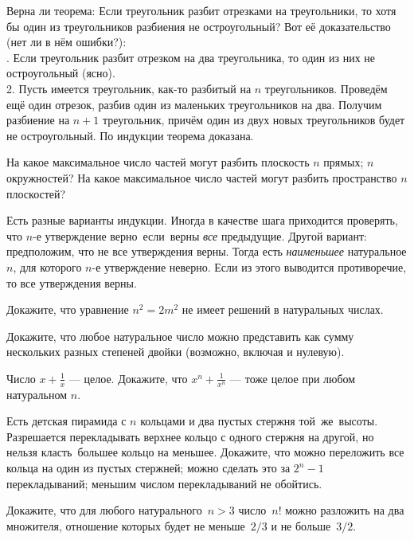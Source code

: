 \documentclass[a4paper,11pt]{article}
\begin{document}
 Верна ли теорема:  Если треугольник разбит отрезками
на треугольники, то хотя бы один из треугольников разбиения не
остроугольный?
Вот е\"е доказательство (нет ли в н\"ем ошибки?):\\
{. Если треугольник разбит отрезком на два треугольника,
то один из них не остроугольный (ясно).\\
2. Пусть имеется треугольник, как-то разбитый на $n$ треугольников.
Провед\"ем ещ\"е один отрезок, разбив один из маленьких треугольников
на два. Получим разбиение на $n+1$ треугольник, прич\"ем один из
двух новых треугольников будет не остроугольный.
По индукции теорема доказана.}

На какое максимальное число частей могут разбить плоскость
 $n$ прямых;  $n$ окружностей?
%
 На какое максимальное число частей могут разбить пространство
$n$ плоскостей?

\smallskip

{\footnotesize
\noindent
Есть разные варианты индукции. Иногда в качестве шага
приходится проверять, что $n$-е
утверждение верно~\hbox{если}~верны {\em все} предыдущие. Другой
вариант: предположим, что не все утверждения верны. Тогда
есть {\em наименьшее} на\-ту\-ра\-ль\-ное $n$, для которого $n$-е
утверждение неверно. Если из этого выводится противоречие,
то все утверждения верны.

}

\smallskip

Докажите, что уравнение $n^2=2m^2$ не имеет решений в
натуральных числах.

Докажите, что любое натуральное число можно представить как сумму нескольких
разных степеней двойки (возможно, включая и нулевую).

Число $\displaystyle x+\frac1x$ --- целое.
Докажите, что
$\displaystyle x^n+\frac1{x^n}$ --- тоже целое при любом
натуральном $n$.


Есть детская пирамида с $n$ кольцами и два пустых стержня
той~же~высоты.
Разрешается перекладывать верхнее кольцо с одного стержня на
другой, но нельзя класть~большее кольцо на меньшее.
Докажите, что
 можно переложить все кольца на один из пустых стержней;
 можно сделать это за $2^n-1$ перекладываний;
 меньшим числом перекладываний не обойтись.

Докажите, что для любого натурального~$n>3$ число~$n!$ можно разложить на два
множителя, отношение которых будет не меньше~$2/3$ и не больше~$3/2$.
\end{document}
